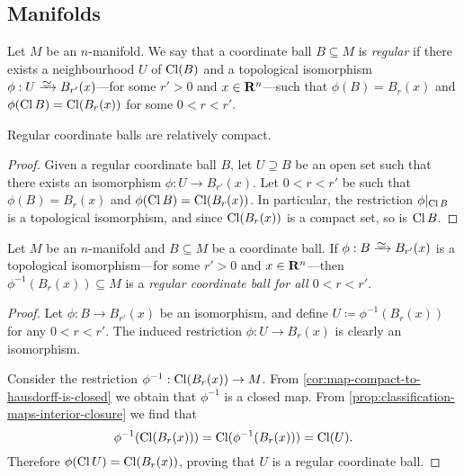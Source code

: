 \subsection{Manifolds}

\begin{definition}
    \label{def:regular-coordinate-ball}
    Let \(M\) be an \(n\)-manifold. We say that a coordinate ball \(B \subseteq M\)
    is \emph{regular} if there exists a neighbourhood \(U\) of \(\operatorname{Cl}(B)\) and a
    topological isomorphism \(\phi: U \isoto B_{r'}(x)\)---for some \(r' > 0\) and
    \(x \in \mathbf{R}^n\)---such that \(\phi(B) = B_r(x)\) and
    \(\phi(\operatorname{Cl} B) = \operatorname{Cl}(B_r(x))\) for some \(0 < r < r'\).
\end{definition}

\begin{corollary}
    \label{cor:reg-coord-balls-are-rel-cpct}
    Regular coordinate balls are relatively compact.
\end{corollary}

\begin{proof}
    Given a regular coordinate ball \(B\), let \(U \supseteq B\) be an open set such
    that there exists an isomorphism \(\phi: U \to B_{r'}(x)\). Let \(0 < r < r'\)
    be such that \(\phi(B) = B_r(x)\) and \(\phi(\operatorname{Cl} B) = \operatorname{Cl}(B_r(x))\). In
    particular, the restriction \(\phi|_{\operatorname{Cl} B}\) is a topological isomorphism, and
    since \(\operatorname{Cl}(B_r(x))\) is a compact set, so is \(\operatorname{Cl} B\).
\end{proof}

\begin{lemma}
    \label{lem:reg-coord-ball-from-iso}
    Let \(M\) be an \(n\)-manifold and \(B \subseteq M\) be a coordinate ball. If
    \(\phi: B \isoto B_{r'}(x)\) is a topological isomorphism---for some
    \(r' > 0\) and \(x \in \mathbf{R}^n\)---then \(\phi^{-1}(B_r(x)) \subseteq M\) is a
    \emph{regular coordinate ball for all \(0 < r < r'\)}.
\end{lemma}

\begin{proof}
    Let \(\phi: B \to B_{r'}(x)\) be an isomorphism, and define
    \(U \coloneq \phi^{-1}(B_r(x))\) for any \(0 < r < r'\). The induced restriction
    \(\phi: U \to B_r(x)\) is clearly an isomorphism.

    Consider the restriction \(\phi^{-1}: \operatorname{Cl}(B_r(x)) \to M\). From
    \cref{cor:map-compact-to-hausdorff-is-closed} we obtain that \(\phi^{-1}\) is a
    closed map. From \cref{prop:classification-maps-interior-closure} we find that
    \[
        \phi^{-1}(\operatorname{Cl}(B_r(x))) = \operatorname{Cl}(\phi^{-1}(B_r(x))) = \operatorname{Cl}(U).
    \]
    Therefore \(\phi(\operatorname{Cl} U) = \operatorname{Cl}(B_r(x))\), proving that \(U\) is a regular
    coordinate ball.
\end{proof}

